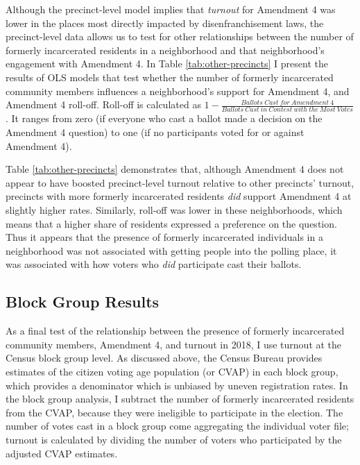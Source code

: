 \documentclass[
  12pt,
]{article}
\begin{document}
Although the precinct-level model implies that \emph{turnout} for Amendment 4 was lower in the places most directly impacted by disenfranchisement laws, the precinct-level data allows us to test for other relationships between the number of formerly incarcerated residents in a neighborhood and that neighborhood's engagement with Amendment 4. In Table \ref{tab:other-precincts} I present the results of OLS models that test whether the number of formerly incarcerated community members influences a neighborhood's support for Amendment 4, and Amendment 4 roll-off. Roll-off is calculated as \(1 - \frac{Ballots\:Cast\:for\:Amendment\:4}{Ballots\:Cast\:in\:Contest\:with\:the\:Most\:Votes}\). It ranges from zero (if everyone who cast a ballot made a decision on the Amendment 4 question) to one (if no participants voted for or against Amendment 4).

\begin{singlespace}


\end{singlespace}

Table \ref{tab:other-precincts} demonstrates that, although Amendment 4 does not appear to have boosted precinct-level turnout relative to other precincts' turnout, precincts with more formerly incarcerated residents \emph{did} support Amendment 4 at slightly higher rates. Similarly, roll-off was lower in these neighborhoods, which means that a higher share of residents expressed a preference on the question. Thus it appears that the presence of formerly incarcerated individuals in a neighborhood was not associated with getting people into the polling place, it was associated with how voters who \emph{did} participate cast their ballots.

\hypertarget{block-group-results}{%
\subsection*{Block Group Results}\label{block-group-results}}

As a final test of the relationship between the presence of formerly incarcerated community members, Amendment 4, and turnout in 2018, I use turnout at the Census block group level. As discussed above, the Census Bureau provides estimates of the citizen voting age population (or CVAP) in each block group, which provides a denominator which is unbiased by uneven registration rates. In the block group analysis, I subtract the number of formerly incarcerated residents from the CVAP, because they were ineligible to participate in the election. The number of votes cast in a block group come aggregating the individual voter file; turnout is calculated by dividing the number of voters who participated by the adjusted CVAP estimates.
\end{document}
